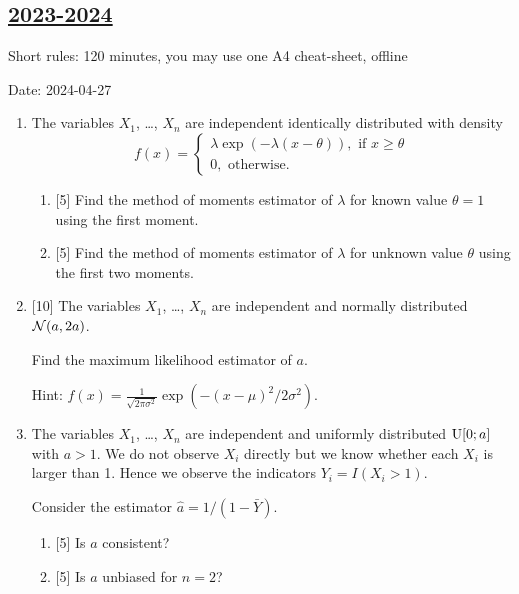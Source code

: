 \subsection[2023-2024]{\hyperref[sec:sol_kr_04_2023_2024]{2023-2024}}
\label{sec:kr_04_2023_2024} %

Short rules: 120 minutes, you may use one A4 cheat-sheet, offline

Date: 2024-04-27

\begin{enumerate}
    \item The variables $X_1$, \ldots, $X_n$ are independent identically distributed with density 
    \[
    f(x) = \begin{cases}
      \lambda \exp(-\lambda (x - \theta)), \text{ if } x\geq \theta \\
      0, \text{ otherwise}.
    \end{cases}  
    \]
    \begin{enumerate}
      \item {[5]} Find the method of moments estimator of $\lambda$ for known value $\theta = 1$ using the first moment. 
      \item {[5]} Find the method of moments estimator of $\lambda$ for unknown value $\theta$ using the first two moments. 
    \end{enumerate}

    \item {[10]} The variables $X_1$, \ldots, $X_n$ are independent and normally distributed $\mathcal{N}(a, 2a)$.
  
    Find the maximum likelihood estimator of $a$.
  
    Hint: $f(x) = \frac{1}{\sqrt{2\pi \sigma^2}} \exp(-(x-\mu)^2/2\sigma^2)$.

    \item The variables $X_1$, \ldots, $X_n$ are independent and uniformly distributed $\mathrm{U}[0;a]$ with $a>1$.
    We do not observe $X_i$ directly but we know whether each $X_i$ is larger than 1. 
    Hence we observe the indicators $Y_i = I(X_i > 1)$.
  
    Consider the estimator $\hat a = 1 / (1 - \bar Y)$.
  
    \begin{enumerate}
      \item {[5]} Is $\hat a$ consistent?
      \item {[5]} Is $\hat a$ unbiased for $n=2$?
    \end{enumerate}


\end{enumerate}
